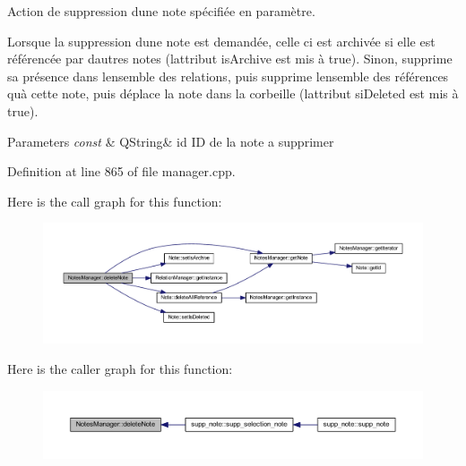Action de suppression d\textquotesingle{}une note spécifiée en paramètre. 

Lorsque la suppression d\textquotesingle{}une note est demandée, celle ci est archivée si elle est référencée par d\textquotesingle{}autres notes (l\textquotesingle{}attribut is\+Archive est mis à true). Sinon, supprime sa présence dans l\textquotesingle{}ensemble des relations, puis supprime l\textquotesingle{}ensemble des références qu\textquotesingle{}à cette note, puis déplace la note dans la corbeille (l\textquotesingle{}attribut si\+Deleted est mis à true). 
\begin{DoxyParams}{Parameters}
{\em const} & Q\+String\& id ID de la note a supprimer \\
\hline
\end{DoxyParams}


Definition at line 865 of file manager.\+cpp.

Here is the call graph for this function\+:\nopagebreak
\begin{figure}[H]
\begin{center}
\leavevmode
\includegraphics[width=350pt]{class_notes_manager_a989429244c36c35ef68204f6ae2a0a5f_cgraph}
\end{center}
\end{figure}
Here is the caller graph for this function\+:\nopagebreak
\begin{figure}[H]
\begin{center}
\leavevmode
\includegraphics[width=350pt]{class_notes_manager_a989429244c36c35ef68204f6ae2a0a5f_icgraph}
\end{center}
\end{figure}
\mbox{\label{class_notes_manager_a3259c7aa22b5f2eee6f7bceddc707b1d}} 

